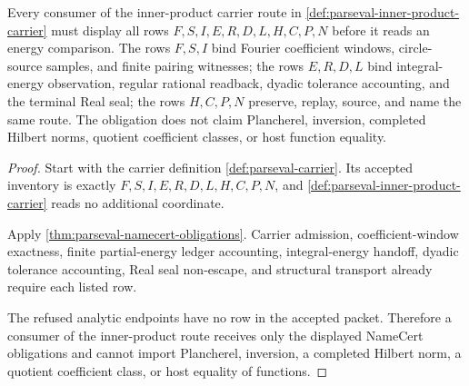 \begin{theorem}
\label{thm:parseval-inner-product-namecert-obligations}
Every consumer of the inner-product carrier route in \autoref{def:parseval-inner-product-carrier} must display all rows $F,S,I,E,R,D,L,H,C,P,N$ before it reads an energy comparison. The rows $F,S,I$ bind Fourier coefficient windows, circle-source samples, and finite pairing witnesses; the rows $E,R,D,L$ bind integral-energy observation, regular rational readback, dyadic tolerance accounting, and the terminal Real seal; the rows $H,C,P,N$ preserve, replay, source, and name the same route. The obligation does not claim Plancherel, inversion, completed Hilbert norms, quotient coefficient classes, or host function equality.
\end{theorem}
\begin{proof}
Start with the carrier definition \autoref{def:parseval-carrier}. Its accepted inventory is exactly $F,S,I,E,R,D,L,H,C,P,N$, and \autoref{def:parseval-inner-product-carrier} reads no additional coordinate.

Apply \autoref{thm:parseval-namecert-obligations}. Carrier admission, coefficient-window exactness, finite partial-energy ledger accounting, integral-energy handoff, dyadic tolerance accounting, Real seal non-escape, and structural transport already require each listed row.

The refused analytic endpoints have no row in the accepted packet. Therefore a consumer of the inner-product route receives only the displayed NameCert obligations and cannot import Plancherel, inversion, a completed Hilbert norm, a quotient coefficient class, or host equality of functions.
\end{proof}

